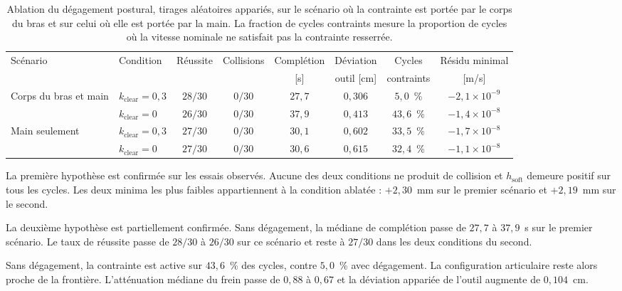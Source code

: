 \begin{table}[htbp]
\centering
\caption[Ablation du dégagement postural]{Ablation du dégagement postural, tirages aléatoires appariés, sur le scénario où la contrainte est portée par le corps du bras et sur celui où elle est portée par la main. La fraction de cycles contraints mesure la proportion de cycles où la vitesse nominale ne satisfait pas la contrainte resserrée.}
\label{tab:res_abl_clearance}
\scriptsize
\setlength{\tabcolsep}{2.5pt}
\begin{tabular}{llcccccc}
\toprule
Scénario & Condition & Réussite & Collisions & Complétion & Déviation & Cycles & Résidu minimal \\
 & & & & [s] & outil [cm] & contraints & [m/s] \\
\midrule
Corps du bras et main & $k_{\mathrm{clear}}=0{,}3$ & $28/30$ & $0/30$ & $27{,}7$ & $0{,}306$ & $5{,}0$~\%  & $-2{,}1\times10^{-9}$ \\
              & $k_{\mathrm{clear}}=0$     & $26/30$ & $0/30$ & $37{,}9$ & $0{,}413$ & $43{,}6$~\% & $-1{,}4\times10^{-8}$ \\
\addlinespace
Main seulement        & $k_{\mathrm{clear}}=0{,}3$ & $27/30$ & $0/30$ & $30{,}1$ & $0{,}602$ & $33{,}5$~\% & $-1{,}7\times10^{-8}$ \\
              & $k_{\mathrm{clear}}=0$     & $27/30$ & $0/30$ & $30{,}6$ & $0{,}615$ & $32{,}4$~\% & $-1{,}1\times10^{-8}$ \\
\bottomrule
\end{tabular}
\end{table}

La première hypothèse est confirmée sur les essais observés. Aucune des deux conditions ne produit de collision et $h_{\mathrm{soft}}$ demeure positif sur tous les cycles. Les deux minima les plus faibles appartiennent à la condition ablatée : $+2{,}30$~mm sur le premier scénario et $+2{,}19$~mm sur le second.

La deuxième hypothèse est partiellement confirmée. Sans dégagement, la médiane de complétion passe de $27{,}7$ à $37{,}9$~s sur le premier scénario. Le taux de réussite passe de $28/30$ à $26/30$ sur ce scénario et reste à $27/30$ dans les deux conditions du second.

Sans dégagement, la contrainte est active sur $43{,}6$~\% des cycles, contre $5{,}0$~\% avec dégagement. La configuration articulaire reste alors proche de la frontière. L'atténuation médiane du frein passe de $0{,}88$ à $0{,}67$ et la déviation appariée de l'outil augmente de $0{,}104$~cm.

